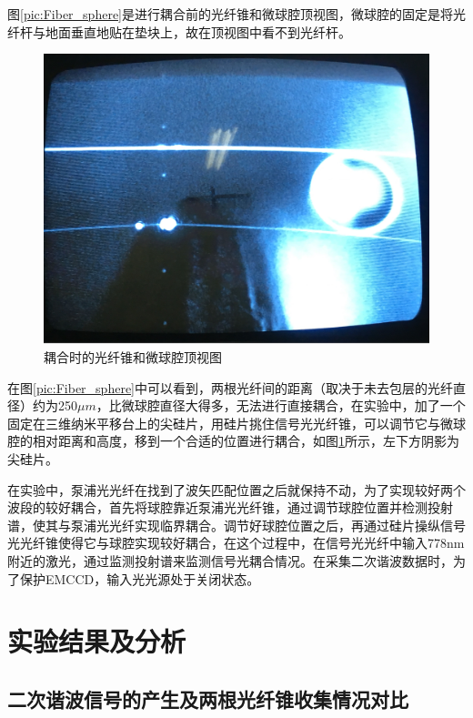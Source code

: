 \documentclass[UTF8,a4paper,cs4size,hyperref]{ctexart}
\begin{document}
图\ref{pic:Fiber_sphere}是进行耦合前的光纤锥和微球腔顶视图，微球腔的固定是将光纤杆与地面垂直地贴在垫块上，故在顶视图中看不到光纤杆。

\begin{figure}
\centering
\includegraphics[width=16cm ]{coupling}
\caption{耦合时的光纤锥和微球腔顶视图}
\label{pic:coupling}
\end{figure}

在图\ref{pic:Fiber_sphere}中可以看到，两根光纤间的距离（取决于未去包层的光纤直径）约为250$\mu m$，比微球腔直径大得多，无法进行直接耦合，在实验中，加了一个固定在三维纳米平移台上的尖硅片，用硅片挑住信号光光纤锥，可以调节它与微球腔的相对距离和高度，移到一个合适的位置进行耦合，如图\ref{pic:coupling}所示，左下方阴影为尖硅片。

在实验中，泵浦光光纤在找到了波矢匹配位置之后就保持不动，为了实现较好两个波段的较好耦合，首先将球腔靠近泵浦光光纤锥，通过调节球腔位置并检测投射谱，使其与泵浦光光纤实现临界耦合。调节好球腔位置之后，再通过硅片操纵信号光光纤锥使得它与球腔实现较好耦合，在这个过程中，在信号光光纤中输入778nm附近的激光，通过监测投射谱来监测信号光耦合情况。在采集二次谐波数据时，为了保护EMCCD，输入光光源处于关闭状态。

\newpage
\section{实验结果及分析}
\label{sec:measurement}

\subsection{二次谐波信号的产生及两根光纤锥收集情况对比}
\end{document}
